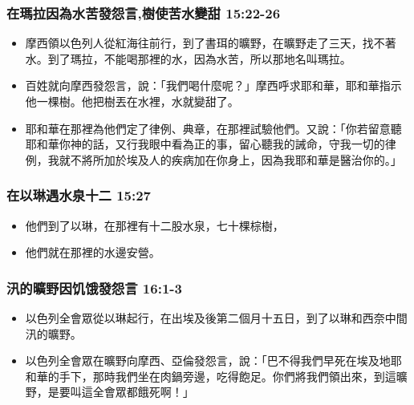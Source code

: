 \subsubsection{在瑪拉因為水苦發怨言,樹使苦水變甜 15:22-26}
\begin{itemize} 
\itemsep-.35em
\item 摩西領以色列人從紅海往前行，到了書珥的曠野，在曠野走了三天，找不著水。到了瑪拉，不能喝那裡的水，因為水苦，所以那地名叫瑪拉。 
\item 百姓就向摩西發怨言，說：「我們喝什麼呢？」摩西呼求耶和華，耶和華指示他一棵樹。他把樹丟在水裡，水就變甜了。
\item 耶和華在那裡為他們定了律例、典章，在那裡試驗他們。又說：「你若留意聽耶和華你神的話，又行我眼中看為正的事，留心聽我的誡命，守我一切的律例，我就不將所加於埃及人的疾病加在你身上，因為我耶和華是醫治你的。」
\end{itemize}

\subsubsection{在以琳遇水泉十二 15:27}
\begin{itemize} 
\itemsep-.35em
\item 他們到了以琳，在那裡有十二股水泉，七十棵棕樹，
\item 他們就在那裡的水邊安營。
\end{itemize}

\subsubsection{汛的曠野因饥饿發怨言 16:1-3}
\begin{itemize} 
\itemsep-.35em
\item 以色列全會眾從以琳起行，在出埃及後第二個月十五日，到了以琳和西奈中間汛的曠野。
\item 以色列全會眾在曠野向摩西、亞倫發怨言，說：「巴不得我們早死在埃及地耶和華的手下，那時我們坐在肉鍋旁邊，吃得飽足。你們將我們領出來，到這曠野，是要叫這全會眾都餓死啊！」
\end{itemize}

